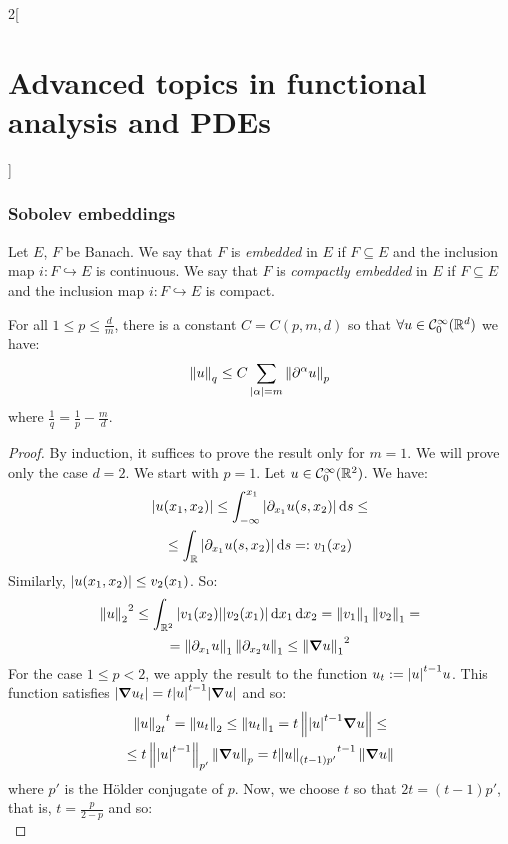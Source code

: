 \documentclass[../../../main_math.tex]{subfiles}
\begin{document}
\begin{multicols}{2}[\section{Advanced topics in functional analysis and PDEs}]
  \subsubsection{Sobolev embeddings}
  \begin{definition}
    Let $E$, $F$ be Banach. We say that $F$ is \emph{embedded} in $E$ if $F\subseteq E$ and the inclusion map $i:F\hookrightarrow  E$ is continuous. We say that $F$ is \emph{compactly embedded} in $E$ if $F\subseteq E$ and the inclusion map $i:F\hookrightarrow  E$ is compact.
  \end{definition}
  \begin{theorem}
    For all $1\leq p\leq\frac{d}{m}$, there is a constant $C=C(p,m,d)$ so that $\forall u\in \mathcal{C}_0^\infty(\mathbb{R}^d)$ we have:
    $$
      \left\|u\right\|_{q}\leq C\sum_{\abs{\alpha}= m}{\left\|\partial^\alpha u\right\|_p}$$
    where $\displaystyle\frac{1}{q}=\frac{1}{p}-\frac{m}{d}$.
  \end{theorem}
  \begin{proof}
    By induction, it suffices to prove the result only for $m=1$. We will prove only the case $d=2$. We start with $p=1$. Let $u\in \mathcal{C}_0^\infty(\mathbb{R}^2)$. We have:
    \begin{multline*}
      \abs{u(x_1,x_2)}\leq \int_{-\infty}^{x_1}\abs{\partial_{x_1}u(s,x_2)}\dd{s}\leq\\\leq\int_{\mathbb{R}}\abs{\partial_{x_1}u(s,x_2)}\dd{s}=:v_1(x_2)
    \end{multline*}
    Similarly, $\abs{u(x_1,x_2)}\leq v_2(x_1)$. So:
    \begin{multline*}
      {\left\|u\right\|_2}^2\leq \int_{\mathbb{R}^2} \abs{v_1(x_2)}\abs{v_2(x_1)}\dd{x_1}\dd{x_2}=\left\|v_1\right\|_1 \left\|v_2\right\|_1=\\=\left\|\partial_{x_1}u\right\|_1\left\|\partial_{x_2}u\right\|_1\leq {\left\|\grad u\right\|_1}^2
    \end{multline*}
    For the case $1\leq p<2$, we apply the result to the function $u_t:=\abs{u}^{t-1}u$. This function satisfies $\abs{\grad u_t}=t\abs{u}^{t-1}\abs{\grad u}$ and so:
    \begin{multline*}
      {\left\|u\right\|_{2t}}^t=\left\|u_t\right\|_2\leq \left\|u_t\right\|_1=t\left\|\abs{u}^{t-1}\grad u\right\|\leq \\\leq t\left\|\abs{u}^{t-1}\right\|_{p'}\left\|\grad u\right\|_p=t{\left\|u\right\|_{(t-1)p'}}^{t-1} \left\|\grad u\right\|
    \end{multline*}
    where $p'$ is the Hölder conjugate of $p$. Now, we choose $t$ so that $2t=(t-1)p'$, that is, $t=\frac{p}{2-p}$ and so:
    $$
$$
\end{proof}
\end{multicols}
\end{document}
